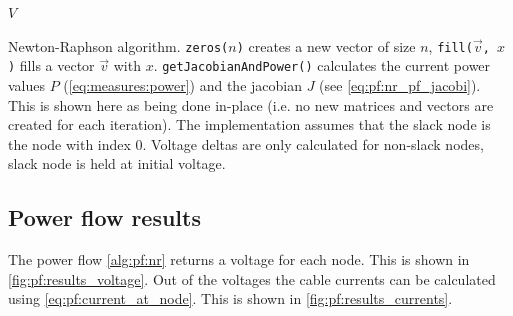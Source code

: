 \begin{algorithm}[h!]
{        \KwRet $V$\;
    }
    \caption{
        Newton-Raphson algorithm. \texttt{zeros($n$)} creates a new vector of size $n$,
        \texttt{fill($\vec{v}$, $x$)} fills a vector $\vec{v}$ with $x$.
        \texttt{getJacobianAndPower()}
        calculates the current power values $P$ (\autoref{eq:measures:power})
        and the jacobian $J$ (see \autoref{eq:pf:nr_pf_jacobi}).
        This is shown here as being done in-place 
        (i.e. no new matrices and vectors are created for each iteration).
        The implementation assumes that the slack node is the node with index 0.
        Voltage deltas are only calculated for non-slack nodes, slack node is
        held at initial voltage.
    }
    \label{alg:pf:nr}
\end{algorithm}

\subsection{Power flow results}

The power flow \autoref{alg:pf:nr} returns a voltage for each node. This is shown
in \autoref{fig:pf:results_voltage}. Out
of the voltages the cable currents can be
calculated using \autoref{eq:pf:current_at_node}. This is shown in
\autoref{fig:pf:results_currents}.

